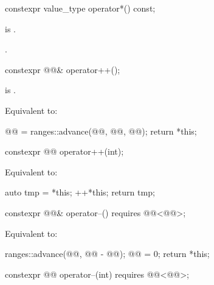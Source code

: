 \begin{itemdecl}
constexpr value_type operator*() const;
\end{itemdecl}

\begin{itemdescr}
\pnum
\expects
{} is .

\pnum
\returns
{}.
\end{itemdescr}

\begin{itemdecl}
constexpr @@& operator++();
\end{itemdecl}

\begin{itemdescr}
\pnum
\expects
{} is .

\pnum
\effects
Equivalent to:
\begin{codeblock}
@@ = ranges::advance(@@, @@, @@);
return *this;
\end{codeblock}
\end{itemdescr}

\begin{itemdecl}
constexpr @@ operator++(int);
\end{itemdecl}

\begin{itemdescr}
\pnum
\effects
Equivalent to:
\begin{codeblock}
auto tmp = *this;
++*this;
return tmp;
\end{codeblock}
\end{itemdescr}

\begin{itemdecl}
constexpr @@& operator--() requires @@<@@>;
\end{itemdecl}

\begin{itemdescr}
\pnum
\effects
Equivalent to:
\begin{codeblock}
ranges::advance(@@, @@ - @@);
@@ = 0;
return *this;
\end{codeblock}
\end{itemdescr}

\begin{itemdecl}
constexpr @@ operator--(int) requires @@<@@>;
\end{itemdecl}

